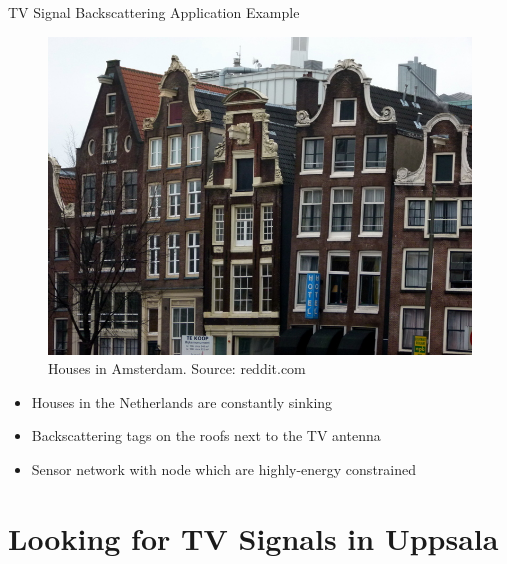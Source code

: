 \documentclass[apectratio=169]{beamer}
\begin{document}
\begin{frame}{TV Signal Backscattering Application Example}
\begin{minipage}{0.45\textwidth}
	\begin{figure}[H]	
		\centering
		\includegraphics[height=0.5\textheight]{./fig/elmars_home}
		\caption{Houses in Amsterdam. Source: reddit.com}
	\end{figure}
\end{minipage}
\hfill
\begin{minipage}{0.45\textwidth}
	\begin{itemize}
		\item<1-> Houses in the Netherlands are constantly sinking
		\item<2-> Backscattering tags on the roofs next to the TV antenna
		\item<3-> Sensor network with node which are highly-energy constrained
	\end{itemize}
\end{minipage}
\end{frame}


\section{Looking for TV Signals in Uppsala}
\end{document}
